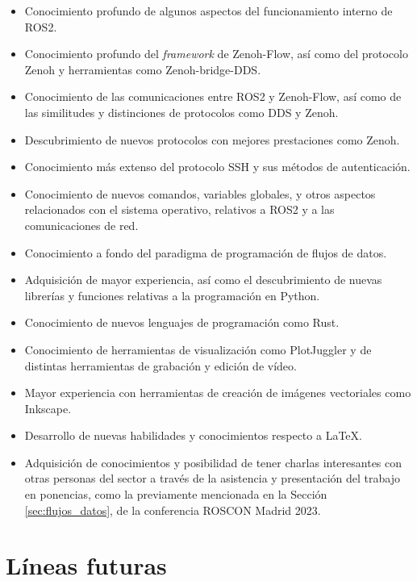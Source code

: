 \begin{itemize}
    \item{Conocimiento profundo de algunos aspectos del funcionamiento interno
        de ROS2.}
    \item{Conocimiento profundo del \textit{framework} de Zenoh-Flow, así como
        del protocolo Zenoh y herramientas como Zenoh-bridge-DDS.}
    \item{Conocimiento de las comunicaciones entre ROS2 y Zenoh-Flow, así como
        de las similitudes y distinciones de protocolos como DDS y Zenoh.}
    \item{Descubrimiento de nuevos protocolos con mejores prestaciones como
        Zenoh.}
    \item{Conocimiento más extenso del protocolo SSH y sus métodos de
        autenticación.}
    \item{Conocimiento de nuevos comandos, variables globales, y otros aspectos
        relacionados con el sistema operativo, relativos a ROS2 y a las
        comunicaciones de red.}
    \item{Conocimiento a fondo del paradigma de programación de flujos de
        datos.}
    \item{Adquisición de mayor experiencia, así como el descubrimiento de nuevas
        librerías y funciones relativas a la programación en Python.}
    \item{Conocimiento de nuevos lenguajes de programación como Rust.}
    \item{Conocimiento de herramientas de visualización como PlotJuggler y de
        distintas herramientas de grabación y edición de vídeo.}
    \item{Mayor experiencia con herramientas de creación de imágenes vectoriales
        como Inkscape.}
    \item{Desarrollo de nuevas habilidades y conocimientos respecto a \LaTeX.}
    \item{Adquisición de conocimientos y posibilidad de tener charlas
        interesantes con otras personas del sector a través de la asistencia y
        presentación del trabajo en ponencias, como la previamente mencionada en
        la Sección \ref{sec:flujos_datos}, de la conferencia ROSCON Madrid
        2023.}
\end{itemize}


\section{Líneas futuras}
\label{sec:lineas_futuras}

